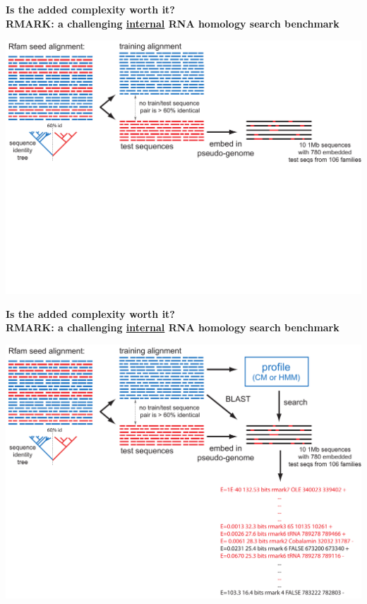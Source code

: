 \documentclass[landscape]{slides}
\begin{document}
\begin{slide}
\begin{center}
\textbf{Is the added complexity worth it? \\
  RMARK: a challenging \underline{internal} RNA homology search
  benchmark}

\includegraphics[width=10in]{figs/rmark-tree-1}
\end{center}

\vfill
\end{slide}
\begin{slide}
\begin{center}
\textbf{Is the added complexity worth it? \\
  RMARK: a challenging \underline{internal} RNA homology search
  benchmark}

\includegraphics[width=10in]{figs/rmark-tree-2}
\end{center}

\vfill
\end{slide}
\end{document}
